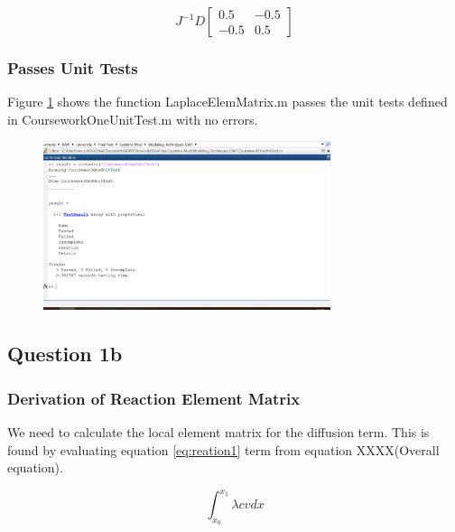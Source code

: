 \documentclass[11pt]{article}
\begin{document}
\begin{equation} \label{eq:diffmatrix}
J^{-1}D
\begin{bmatrix}

0.5 & -0.5 \\
-0.5 & 0.5
\end{bmatrix}
\end{equation}


\subsubsection{Passes Unit Tests}

Figure \ref{fig:unittest1} shows the function LaplaceElemMatrix.m passes the unit tests defined in CourseworkOneUnitTest.m with no errors.

\begin{figure}[h!]
\centering \label{fig:unittest1}
\includegraphics[width=0.75\textwidth]{CW1Test.PNG}
\end{figure}



\subsection{Question 1b}
\subsubsection{Derivation of Reaction Element Matrix}

We need to calculate the local element matrix for the diffusion term. This is found by evaluating equation \ref{eq:reation1} term from equation XXXX(Overall equation).

\begin{equation} \label{eq:reation1}
\int_{x_{0}}^{x_{1}} \lambda c v  dx
\end{equation}
\end{document}
